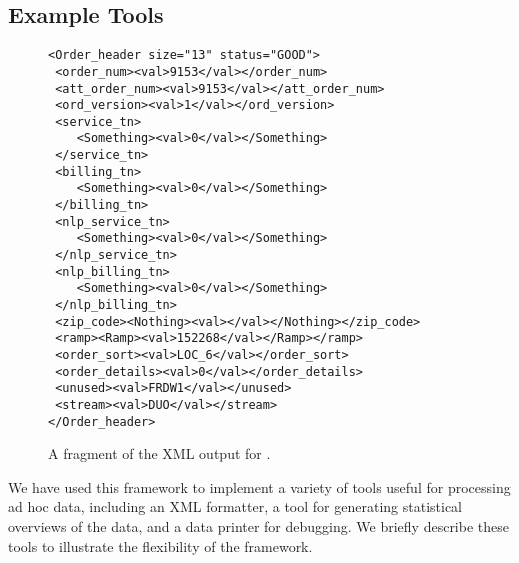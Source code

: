 \subsection{Example Tools}
\label{sec:gentool-motivation-ex}

\begin{figure}
  \centering
  \scriptsize
\begin{verbatim}
<Order_header size="13" status="GOOD">
 <order_num><val>9153</val></order_num>
 <att_order_num><val>9153</val></att_order_num>
 <ord_version><val>1</val></ord_version>
 <service_tn>
    <Something><val>0</val></Something>
 </service_tn>
 <billing_tn>
    <Something><val>0</val></Something>
 </billing_tn>
 <nlp_service_tn>
    <Something><val>0</val></Something>
 </nlp_service_tn>
 <nlp_billing_tn>
    <Something><val>0</val></Something>
 </nlp_billing_tn>
 <zip_code><Nothing><val></val></Nothing></zip_code>
 <ramp><Ramp><val>152268</val></Ramp></ramp>
 <order_sort><val>LOC_6</val></order_sort>
 <order_details><val>0</val></order_details>
 <unused><val>FRDW1</val></unused>
 <stream><val>DUO</val></stream>
</Order_header>
\end{verbatim}  
  \caption{A fragment of the XML output for \dibbler{}. }
  \label{fig:gentool-xml-output}
\end{figure}

We have used this framework to implement a variety of tools useful for processing ad hoc data, including an XML formatter, a tool for generating statistical overviews of the data, and a data printer for debugging.  We briefly describe these tools to illustrate the flexibility of the framework.

